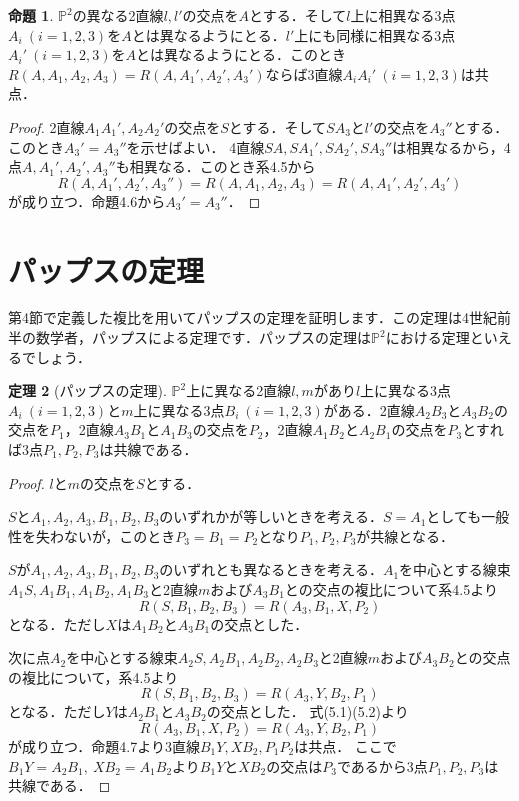 \documentclass{jsarticle}
\theoremstyle{definition}
\newtheorem{theorem}{定理}
\newtheorem{prop}[theorem]{命題}
\numberwithin{theorem}{section}
\numberwithin{equation}{section}
\begin{document}
\begin{prop}
    $\mathbb{P}^2$の異なる2直線$l,l'$の交点を$A$とする．そして$l$上に相異なる3点$A_i\ (i=1,2,3)$を$A$とは異なるようにとる．$l'$上にも同様に相異なる3点$A_i'\ (i=1,2,3)$を$A$とは異なるようにとる．このとき$R(A,A_1,A_2,A_3)=R(A,A_1',A_2',A_3')$ならば3直線$A_iA_i'\ (i=1,2,3)$は共点．
\end{prop}
\begin{proof}
    2直線$A_1A_1',A_2A_2'$の交点を$S$とする．そして$SA_3$と$l'$の交点を$A_3''$とする．このとき$A_3'=A_3''$を示せばよい．
    4直線$SA,SA_1',SA_2',SA_3''$は相異なるから，4点$A,A_1',A_2',A_3''$も相異なる．このとき系4.5から
    $$R(A,A_1',A_2',A_3'')=R(A,A_1,A_2,A_3)=R(A,A_1',A_2',A_3')$$
が成り立つ．命題4.6から$A_3'=A_3''$．
\end{proof}
\section{パップスの定理}
第4節で定義した複比を用いてパップスの定理を証明します．この定理は4世紀前半の数学者，パップスによる定理です．パップスの定理は$\mathbb{P}^2$における定理といえるでしょう．
\begin{theorem}[パップスの定理]
    $\mathbb{P}^2$上に異なる2直線$l,m$があり$l$上に異なる3点$A_i\ (i=1,2,3)$と$m$上に異なる3点$B_i\ (i=1,2,3)$がある．2直線$A_2B_3$と$A_3B_2$の交点を$P_1$，2直線$A_3B_1$と$A_1B_3$の交点を$P_2$，2直線$A_1B_2$と$A_2B_1$の交点を$P_3$とすれば3点$P_1,P_2,P_3$は共線である．
\end{theorem}
\begin{proof}
    $l$と$m$の交点を$S$とする．
    \par$S$と$A_1,A_2,A_3,B_1,B_2,B_3$のいずれかが等しいときを考える．$S=A_1$としても一般性を失わないが，このとき$P_3=B_1=P_2$となり$P_1,P_2,P_3$が共線となる．
    \par$S$が$A_1,A_2,A_3,B_1,B_2,B_3$のいずれとも異なるときを考える．$A_1$を中心とする線束$A_1S,A_1B_1,A_1B_2,A_1B_3$と2直線$m$および$A_3B_1$との交点の複比について系4.5より
    \begin{equation}
        R(S,B_1,B_2,B_3)=R(A_3,B_1,X,P_2)
    \end{equation}
    となる．ただし$X$は$A_1B_2$と$A_3B_1$の交点とした．
    \par 次に点$A_2$を中心とする線束$A_2S,A_2B_1,A_2B_2,A_2B_3$と2直線$m$および$A_3B_2$との交点の複比について，系4.5より
    \begin{equation}
        R(S,B_1,B_2,B_3)=R(A_3,Y,B_2,P_1)
    \end{equation}
    となる．ただし$Y$は$A_2B_1$と$A_3B_2$の交点とした．
    式(5.1)(5.2)より
    $$R(A_3,B_1,X,P_2)=R(A_3,Y,B_2,P_1)$$
    が成り立つ．命題4.7より3直線$B_1Y,XB_2,P_1P_2$は共点．
    ここで$B_1Y=A_2B_1,\ XB_2=A_1B_2$より$B_1Y$と$XB_2$の交点は$P_3$であるから3点$P_1,P_2,P_3$は共線である．
\end{proof}
\end{document}
